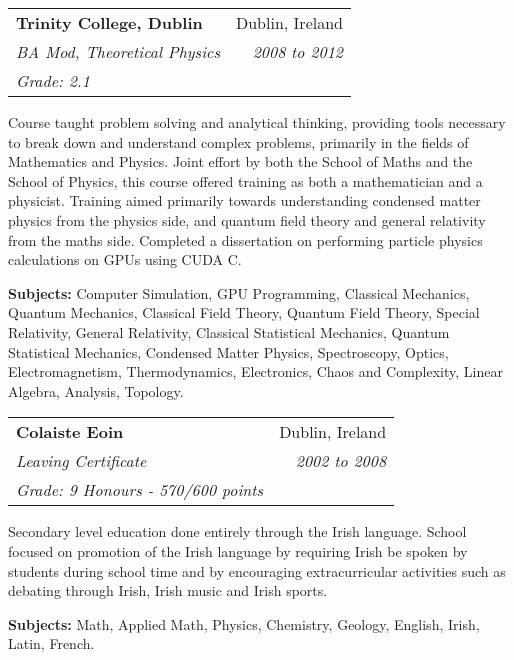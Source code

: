 \documentclass[11pt]{article}
\makeatletter
\newenvironment{resumeSubSectionHeader}{
    \par
    \begin{tabular*}{\textwidth}{l@{\extracolsep{\fill}}r}
    \par
} {
    \end{tabular*}
    \par
}
\newenvironment{resumeSubSectionBody}{
    \par
    \vspace{-0.8\parskip}
    \begin{small}
    \par
} {
    \par
    \end{small}
    \par
}
\makeatother
\begin{document}
\begin{resumeSubSectionHeader}
    \textbf{Trinity College, Dublin} & Dublin, Ireland\\
    \emph{BA Mod, Theoretical Physics} & \emph{2008 to 2012} \\
    \emph{Grade: 2.1}
\end{resumeSubSectionHeader}
\begin{resumeSubSectionBody}
    Course taught problem solving and analytical thinking, providing
    tools necessary to break down and understand complex problems,
    primarily in the fields of Mathematics and Physics.
    Joint effort by both the School of Maths and the School of Physics,
    this course offered training as both a mathematician and a
    physicist.
    Training aimed primarily towards understanding condensed matter
    physics from the physics side, and quantum field theory and general
    relativity from the maths side.
    Completed a dissertation on performing particle physics calculations
    on GPUs using CUDA C.

    \begin{description}
        \item{\bf Subjects:}
            Computer Simulation, GPU Programming,
            Classical Mechanics, Quantum Mechanics,
            Classical Field Theory, Quantum Field Theory,
            Special Relativity, General Relativity,
            Classical Statistical Mechanics, Quantum Statistical Mechanics,
            Condensed Matter Physics, Spectroscopy,
            Optics, Electromagnetism, Thermodynamics,
            Electronics, Chaos and Complexity,
            Linear Algebra, Analysis,
            Topology.
    \end{description}
\end{resumeSubSectionBody}

\begin{resumeSubSectionHeader}
    \textbf{Colaiste Eoin} & Dublin, Ireland\\
    \emph{Leaving Certificate} & \emph{2002 to 2008} \\
    \emph{Grade: 9 Honours - 570/600 points}
\end{resumeSubSectionHeader}
\begin{resumeSubSectionBody}
    Secondary level education done entirely through the Irish language.
    School focused on promotion of the Irish language by requiring Irish
    be spoken by students during school time and by encouraging
    extracurricular activities such as debating through Irish, Irish music
    and Irish sports.

    \begin{description}
        \item{\bf Subjects:}
            Math, Applied Math,
            Physics, Chemistry,
            Geology, English,
            Irish, Latin,
            French.
    \end{description}
\end{resumeSubSectionBody}
\end{document}

